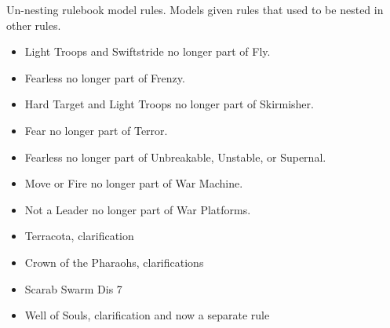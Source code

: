 Un-nesting rulebook model rules. Models given rules that used to be nested in other rules.
\begin{itemize}
\item Light Troops and Swiftstride no longer part of Fly.
\item Fearless no longer part of Frenzy.
\item Hard Target and Light Troops no longer part of Skirmisher.
\item Fear no longer part of Terror.
\item Fearless no longer part of Unbreakable, Unstable, or Supernal.
\item Move or Fire no longer part of War Machine.
\item Not a Leader no longer part of War Platforms.
\end{itemize}
%
%
%
%
\subtitle{Model Rules}

\begin{itemize}
\item Terracota, clarification
\end{itemize}

\subtitle{Special Equipment}

\begin{itemize}
\item Crown of the Pharaohs, clarifications
\end{itemize}

\subtitle{Army List and Units}

\begin{itemize}
\item Scarab Swarm Dis 7
\item Well of Souls, clarification and now a separate rule
\end{itemize}

